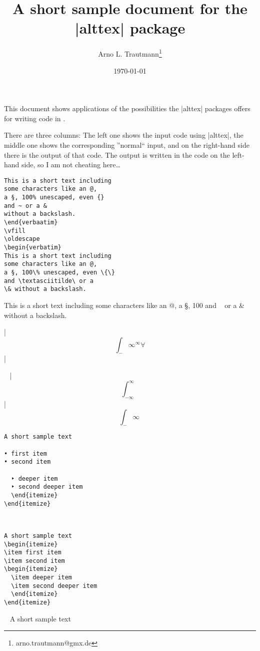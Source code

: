 \documentclass{article}
\title{A short sample document for the |alttex| package}
\author{Arno L. Trautmann\thanks{arno.trautmann@gmx.de}}
\date{\today}
\begin{document}
\maketitle
This document shows applications of the possibilities the |alttex| packages offers for writing code in \XeLaTeX.

There are three columns: The left one shows the input code using |alttex|, the middle one shows the corresponding ”normal“ input, and on the right-hand side there is the output of that code. The output is written in the code on the left-hand side, so I am not cheating here…\vspace{2cm}

\noescape
\begin{verbatim}
This is a short text including
some characters like an @,
a §, 100% unescaped, even {}
and ~ or a &
without a backslash.
\end{verbaatim}
\vfill
\oldescape
\begin{verbatim}
This is a short text including
some characters like an @,
a §, 100\% unescaped, even \{\}
and \textasciitilde\ or a
\& without a backslash.
\end{verbatim}
\vfill
\noescape
This is a short text including
some characters like an @,
a §, 100%
and ~ or a &
without a backslash.
\oldescape
\endsample
\makealtmath

|\[∫_-∞ ^∞ ∀\]|

\ \vfill
|\[\int_{-\infty}^{\infty}\]|
\ \vfill
\[∫_-∞ \ \]%
\endsample

\begin{verbatim}
A short sample text

• first item
• second item

  ‣ deeper item
  ‣ second deeper item
  \end{itemize}
\end{itemize}
\end{verbatim}
\ \vfill
\begin{verbatim}
A short sample text
\begin{itemize}
\item first item
\item second item
\begin{itemize}
  \item deeper item
  \item second deeper item
  \end{itemize}
\end{itemize}
\end{verbatim}
\ \vfill
A short sample text
\end{document}

